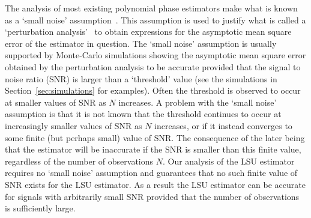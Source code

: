\documentclass[journal]{IEEEtran}
\begin{document}
The analysis of most existing polynomial phase estimators make what is known as a `small noise' assumption~\cite{Peleg_linear_FM,Oshea_cpf_2004,Djurovic_haf_cpf_2012,Djuric_phase_unwrap_chirp_1990,Barbarossa_analysis_of_PPS_1997,Barbarossa_PHAF_1998}.  %
This assumption is used to justify what is called a `perturbation analysis'~%
to obtain expressions for the asymptotic mean square error of the estimator in question.  The `small noise' assumption is usually supported by Monte-Carlo simulations showing the asymptotic mean square error obtained by the perturbation analysis to be accurate provided that the signal to noise ratio (SNR) is larger than a `threshold' value (see the simulations in Section~\ref{sec:simulations} for examples).  Often the threshold is observed to occur at smaller values of SNR as $N$ increases.  A problem with the `small noise' assumption is that it is not known that the threshold continues to occur at increasingly smaller values of SNR as $N$ increases, or if it instead converges to some finite (but perhaps small) value of SNR.  The consequence of the later being that the estimator will be inaccurate if the SNR is smaller than this finite value, regardless of the number of observations $N$.  Our analysis of the LSU estimator requires no `small noise' assumption and guarantees that no such finite value of SNR exists for the LSU estimator.  As a result the LSU estimator can be accurate for signals with arbitrarily small SNR provided that the number of observations is sufficiently large.
\end{document}
